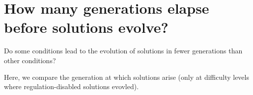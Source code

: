 \documentclass[
]{book}
\newenvironment{Shaded}{\begin{snugshade}}{\end{snugshade}}
\newcommand{\DecValTok}[1]{\textcolor[rgb]{0.00,0.00,0.81}{#1}}
\newcommand{\KeywordTok}[1]{\textcolor[rgb]{0.13,0.29,0.53}{\textbf{#1}}}
\newcommand{\NormalTok}[1]{#1}
\newcommand{\OperatorTok}[1]{\textcolor[rgb]{0.81,0.36,0.00}{\textbf{#1}}}
\newcommand{\StringTok}[1]{\textcolor[rgb]{0.31,0.60,0.02}{#1}}
\begin{document}
\hypertarget{how-many-generations-elapse-before-solutions-evolve}{%
\section{How many generations elapse before solutions evolve?}\label{how-many-generations-elapse-before-solutions-evolve}}

Do some conditions lead to the evolution of solutions in fewer generations than other conditions?

Here, we compare the generation at which solutions arise (only at difficulty levels where regulation-disabled solutions evovled).

\begin{Shaded}
\end{Shaded}
\end{document}
